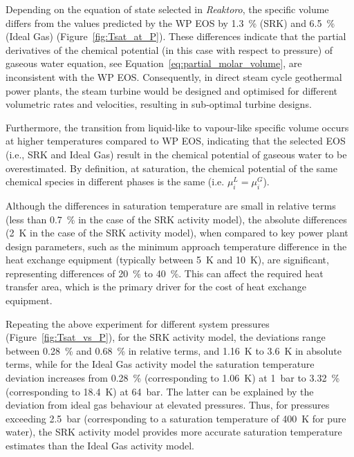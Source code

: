     Depending on the equation of state selected in \emph{Reaktoro}, the specific volume differs from the values predicted by the \ac{WP} \ac{EOS} by \qty{1.3}{\percent} (\ac{SRK}) and \qty{6.5}{\percent} (Ideal Gas) (Figure~\ref{fig:Tsat_at_P}). These differences indicate that the partial derivatives of the chemical potential (in this case with respect to pressure) of gaseous water equation, see Equation~\ref{eq:partial_molar_volume}, are inconsistent with the \ac{WP} \ac{EOS}. Consequently, in direct steam cycle geothermal power plants, the steam turbine would be designed and optimised for different volumetric rates and velocities, resulting in sub-optimal turbine designs.

    Furthermore, the transition from liquid-like to vapour-like specific volume occurs at higher temperatures compared to \ac{WP} \ac{EOS}, indicating that the selected \ac{EOS} (i.e., \ac{SRK} and Ideal Gas) result in the chemical potential of gaseous water to be overestimated. By definition, at saturation, the chemical potential of the same chemical species in different phases is the same (i.e. \(\mu_i^L=\mu_i^G\)).
    
    Although the differences in saturation temperature are small in relative terms (less than \qty{0.7}{\percent} in the case of the \ac{SRK} activity model), the absolute differences (\qty{2}{\K} in the case of the \ac{SRK} activity model), when compared to key power plant design parameters, such as the minimum approach temperature difference in the heat exchange equipment (typically between \qty{5}{\K} and \qty{10}{\K}), are significant, representing differences of \qty{20}{\percent} to \qty{40}{\percent}. This can affect the required heat transfer area, which is the primary driver for the cost of heat exchange equipment.

    Repeating the above experiment for different system pressures (Figure~\ref{fig:Tsat_vs_P}), for the \ac{SRK} activity model, the deviations range between \qty{0.28}{\percent} and \qty{0.68}{\percent} in relative terms, and \qty{1.16}{\K} to \qty{3.6}{\K} in absolute terms, while for the Ideal Gas activity model the saturation temperature deviation increases from \qty{0.28}{\percent} (corresponding to \qty{1.06}{\K}) at \qty{1}{\bar} to \qty{3.32}{\percent} (corresponding to \qty{18.4}{\K}) at \qty{64}{bar}. The latter can be explained by the deviation from ideal gas behaviour at elevated pressures. Thus, for pressures exceeding \qty{2.5}{\bar} (corresponding to a saturation temperature of \qty{400}{\K} for pure water), the \ac{SRK} activity model provides more accurate saturation temperature estimates than the Ideal Gas activity model.

